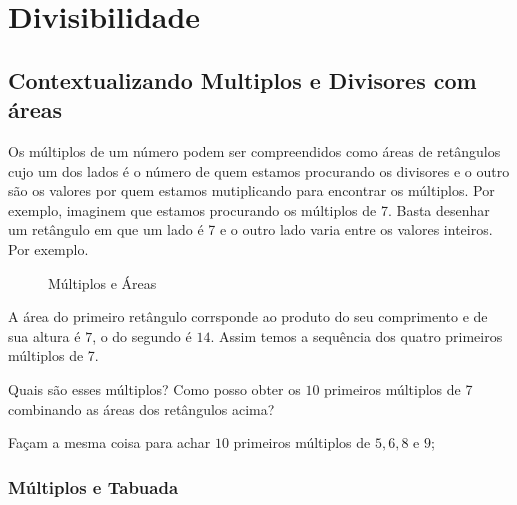 \chapter{Divisibilidade}
\section{Contextualizando Multiplos e Divisores com áreas}

Os múltiplos de um número podem ser compreendidos como áreas de retângulos cujo um dos lados é o número de quem estamos procurando os divisores e o outro são os valores por quem estamos mutiplicando para encontrar os múltiplos. Por exemplo, imaginem que estamos procurando os múltiplos de 7.  Basta desenhar um retângulo em que um lado é 7 e o outro lado varia entre os valores inteiros. Por exemplo.
\begin{figure}[h]
    \centering
    \caption{Múltiplos e Áreas}
    \label{fig:my_label}
\end{figure}


A área do primeiro retângulo corrsponde ao produto do seu comprimento e de sua altura é $7$, o do segundo é $14$. Assim temos a sequência dos quatro primeiros múltiplos de 7.

Quais são esses múltiplos? Como posso obter os $10$ primeiros múltiplos de 7 combinando as áreas dos retângulos acima?

Façam a mesma coisa para achar $10$ primeiros múltiplos de $5,6,8$ e $9$;

\subsection{Múltiplos e Tabuada}


